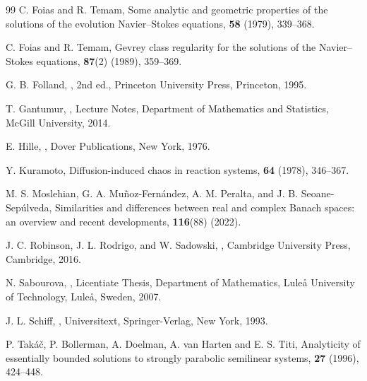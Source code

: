 \documentclass[12pt]{article}
\theoremstyle{plain}
\theoremstyle{remark}
\begin{document}
\begin{thebibliography}{99}
C. Foias and R. Temam,
\newblock Some analytic and geometric properties of the solutions of the evolution Navier--Stokes equations,
 \textbf{58} (1979), 339--368.

C. Foias and R. Temam,
\newblock Gevrey class regularity for the solutions of the Navier--Stokes equations,
 \textbf{87}(2) (1989), 359--369.

G. B. Folland,
,
\newblock 2nd ed., Princeton University Press, Princeton, 1995.

T. Gantumur,
,
\newblock Lecture Notes, Department of Mathematics and Statistics, McGill University, 2014.

E. Hille,
,
\newblock Dover Publications, New York, 1976.

Y. Kuramoto, 
\newblock Diffusion-induced chaos in reaction systems, 
 \textbf{64} (1978), 346--367.

M. S. Moslehian, G. A. Muñoz-Fernández, A. M. Peralta, and J. B. Seoane-Sepúlveda,
\newblock Similarities and differences between real and complex Banach spaces: an overview and recent developments,
 \textbf{116}(88) (2022).

J. C. Robinson, J. L. Rodrigo, and W. Sadowski,
,
\newblock Cambridge University Press, Cambridge, 2016.

N. Sabourova,
,
\newblock Licentiate Thesis, Department of Mathematics, Luleå University of Technology, Luleå, Sweden, 2007.

J. L. Schiff,
,
\newblock Universitext, Springer-Verlag, New York, 1993.

P. Tak\'a\v{c}, P. Bollerman,  A. Doelman, A. van Harten and E. S. Titi,
\newblock  Analyticity of essentially bounded solutions to strongly parabolic semilinear systems,   
\textbf {27} (1996),  424--448.


\end{thebibliography}
\end{document}
